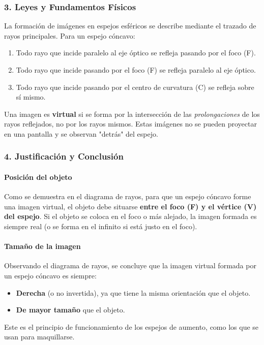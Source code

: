 \subsubsection*{3. Leyes y Fundamentos Físicos}
La formación de imágenes en espejos esféricos se describe mediante el trazado de rayos principales. Para un espejo cóncavo:
\begin{enumerate}
    \item Todo rayo que incide paralelo al eje óptico se refleja pasando por el foco (F).
    \item Todo rayo que incide pasando por el foco (F) se refleja paralelo al eje óptico.
    \item Todo rayo que incide pasando por el centro de curvatura (C) se refleja sobre sí mismo.
\end{enumerate}
Una imagen es \textbf{virtual} si se forma por la intersección de las \textit{prolongaciones} de los rayos reflejados, no por los rayos mismos. Estas imágenes no se pueden proyectar en una pantalla y se observan "detrás" del espejo.

\subsubsection*{4. Justificación y Conclusión}
\paragraph*{Posición del objeto}
Como se demuestra en el diagrama de rayos, para que un espejo cóncavo forme una imagen virtual, el objeto debe situarse \textbf{entre el foco (F) y el vértice (V) del espejo}. Si el objeto se coloca en el foco o más alejado, la imagen formada es siempre real (o se forma en el infinito si está justo en el foco).

\paragraph*{Tamaño de la imagen}
Observando el diagrama de rayos, se concluye que la imagen virtual formada por un espejo cóncavo es siempre:
\begin{itemize}
    \item \textbf{Derecha} (o no invertida), ya que tiene la misma orientación que el objeto.
    \item \textbf{De mayor tamaño} que el objeto.
\end{itemize}
Este es el principio de funcionamiento de los espejos de aumento, como los que se usan para maquillarse.

